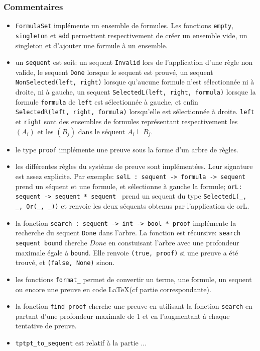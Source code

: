 \documentclass[12pt]{article}
\begin{document}
\subsubsection*{Commentaires}

\begin{itemize}
\item \verb?FormulaSet? implémente un ensemble de formules. Les fonctions \verb?empty?, \verb?singleton? et \verb?add? permettent respectivement de créer un ensemble vide, un singleton et d'ajouter une formule à un ensemble.
\item un \verb?sequent? est soit: un sequent \verb?Invalid? lors de l'application d'une règle non valide, le sequent \verb?Done? lorsque le sequent est prouvé, un sequent \\\verb?NonSelected(left, right)? lorsque qu'aucune formule n'est sélectionnée ni à droite, ni à gauche, un sequent \verb?SelectedL(left, right, formula)? lorsque la formule \verb?formula? de \verb?left? est sélectionnée à gauche, et enfin \\\verb?SelectedR(left, right, formula)? lorsqu'elle est sélectionnée à droite. \verb?left? et \verb?right? sont des ensembles de formules représentant respectivement les $(A_i)$ et les $(B_j)$ dans le séquent $A_i \vdash B_j$.
\item le type \verb?proof? implémente une preuve sous la forme d'un arbre de règles.
\item les différentes règles du système de preuve sont implémentées. Leur signature est assez explicite. Par exemple: \verb?selL : sequent -> formula -> sequent? prend un séquent et une formule, et sélectionne à gauche la formule; \verb?orL: sequent -> sequent * sequent ? prend un sequent du type \verb?SelectedL(_, _, Or(_, _))? et renvoie les deux séquents obtenus par l'application de orL.
\item la fonction \verb?search : sequent -> int -> bool * proof? implémente la recherche du sequent \verb?Done? dans l'arbre. La fonction est récursive: \verb?search sequent bound? cherche $Done$ en constuisant l'arbre avec une profondeur maximale égale à \verb?bound?. Elle renvoie \verb?(true, proof)? si une preuve a été trouvé, et \verb?(false, None)? sinon. 
\item les fonctions \verb?format_? permet de convertir un terme, une formule, un sequent ou encore une preuve en code \LaTeX (cf partie correspondante).
\item la fonction \verb?find_proof? cherche une preuve en utilisant la fonction \verb?search? en partant d'une profondeur maximale de 1 et en l'augmentant à chaque tentative de preuve.
\item \verb?tptpt_to_sequent? est relatif à la partie ...

\end{itemize}
\end{document}
